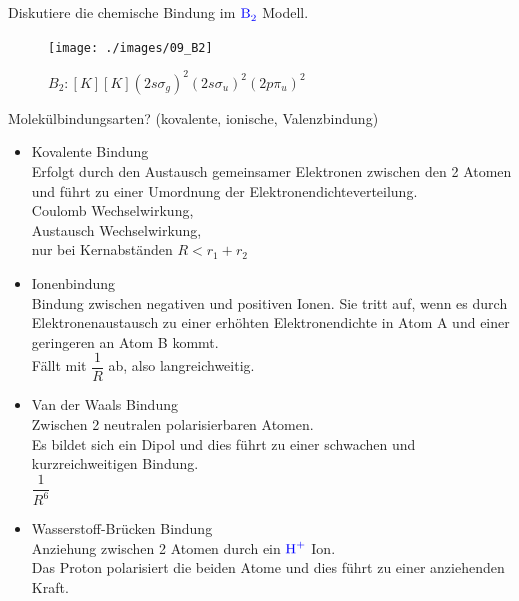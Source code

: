 \documentclass[a5paper,12pt,ngerman,print,grid=front]{kartei}
\let\oldce\ce
\renewcommand*{\ce}[1]{\begingroup\color{blue}\oldce{#1}\endgroup}
\begin{document}
	\begin{karte}{
		Diskutiere die chemische Bindung im $\ce{B2}$ Modell.
		}
		
		\begin{figure}
			\centering
			\texttt{[image: ./images/09\_B2]}
			\caption[Li2]{$B_2: [K][K]  (2s \sigma_g)^2 (2s \sigma_u)^2  (2p \pi_u )^2   $}
			\label{fig:07_Na2}
		\end{figure}
		
	\end{karte}


	\begin{karte}{
		Molekülbindungsarten? (kovalente, ionische, Valenzbindung)
		}
		
		\begin{itemize}
			\item Kovalente Bindung \\
				Erfolgt durch den Austausch gemeinsamer Elektronen zwischen den 2 Atomen und führt zu einer Umordnung der Elektronendichteverteilung. \\
				Coulomb Wechselwirkung, \\
				Austausch Wechselwirkung, \\
				nur bei Kernabständen $ R<r_1+r_2 $
				
			\item Ionenbindung \\
				Bindung zwischen negativen und positiven Ionen. Sie tritt auf, wenn es durch Elektronenaustausch zu einer erhöhten Elektronendichte in Atom A und einer geringeren an Atom B kommt.\\
				Fällt mit $ \dfrac{1}{R} $ ab, also langreichweitig.
			\item Van der Waals Bindung \\
				Zwischen 2 neutralen polarisierbaren Atomen.\\
				Es bildet sich ein Dipol und dies führt zu einer schwachen und kurzreichweitigen Bindung. \\
				$\dfrac{1}{R^6}$
			\item Wasserstoff-Brücken Bindung \\
				Anziehung zwischen 2 Atomen durch ein $\ce{H+}$ Ion. \\
				Das Proton polarisiert die beiden Atome und dies führt zu einer anziehenden Kraft.
		\end{itemize}
		
	\end{karte}
\end{document}
